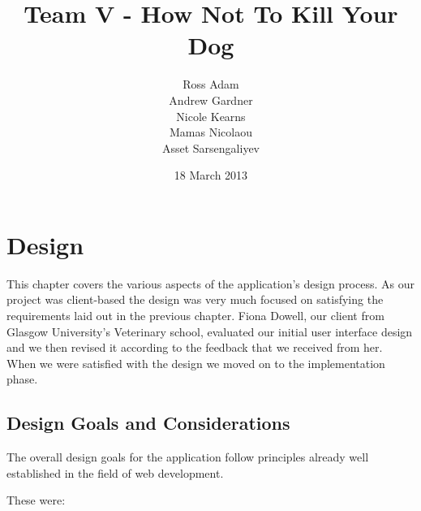 \documentclass{l3proj}
\begin{document}
\title{Team V - How Not To Kill Your Dog}
\author{Ross Adam \\
        Andrew Gardner \\
        Nicole Kearns \\
        Mamas Nicolaou \\
        Asset Sarsengaliyev}
\date{18 March 2013}
\maketitle

\chapter{Design}
\label{design}

This chapter covers the various aspects of the application's design process. As our project was client-based the design was very much focused on satisfying the requirements laid out in the previous chapter. Fiona Dowell, our client from Glasgow University's Veterinary school, evaluated our initial user interface design and we then revised it according to the feedback that we received from her. When we were satisfied with the design we moved on to the implementation phase.

\section{Design Goals and Considerations}

The overall design goals for the application follow principles already well established in the field of web development.

These were:
\end{document}
